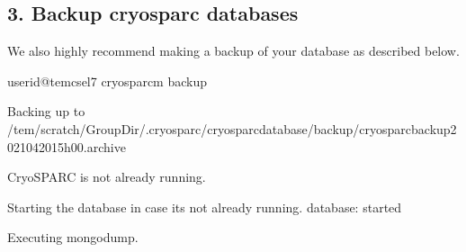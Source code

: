 \documentclass[a4paper,10pt,english]{sphinxmanual}
\begin{document}
\subsection{3. Back\sphinxhyphen{}up cryosparc databases}
\label{\detokenize{faq:back-up-cryosparc-databases}}
\sphinxAtStartPar
We also highly recommend making a backup of your database as described below.

\begin{sphinxVerbatim}[commandchars=\\\{\}]
userid@tem\PYGZhy{}cs\PYGZhy{}el7 \PYGZdl{}\PYGZgt{} cryosparcm backup

Backing up to /tem/scratch/\PYGZlt{}GroupDir\PYGZgt{}/.cryosparc/cryosparc\PYGZus{}database/backup/cryosparc\PYGZus{}backup\PYGZus{}2021\PYGZus{}04\PYGZus{}20\PYGZus{}15h00.archive

CryoSPARC is not already running.

Starting the database in case it\PYGZsq{}s not already running.
database: started

Executing mongodump.


\end{sphinxVerbatim}
\end{document}
